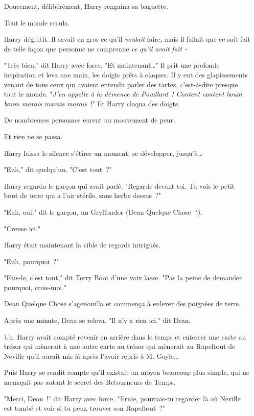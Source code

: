 Doucement, délibérément, Harry rengaina sa baguette.

Tout le monde recula.

Harry déglutit. Il savait en gros ce qu'il \emph{voulait} faire, mais il fallait que ce soit fait de telle façon que personne ne comprenne \emph{ce qu'il avait fait}~-

"Très bien," dit Harry avec force. "Et maintenant…" Il prit une profonde inspiration et leva une main, les doigts prêts à claquer. Il y eut des glapissements venant de tous ceux qui avaient entendu parler des tartes, c'est-à-dire presque tout le monde. "\emph{J'en appelle à la démence de Poudlard~! Content content boum boum marais marais marais}~!" Et Harry claqua des doigts.

De nombreuses personnes eurent un mouvement de peur.

Et rien ne se passa.

Harry laissa le silence s'étirer un moment, se développer, jusqu'à…

"Euh," dit quelqu'un. "C'est tout~?"

Harry regarda le garçon qui avait parlé. "Regarde devant toi. Tu vois le petit bout de terre qui a l'air stérile, sans herbe dessus~?"

"Euh, oui," dit le garçon, un Gryffondor (Dean Quelque Chose~?).

"Creuse ici."

Harry était maintenant la cible de regards intrigués.

"Euh, pourquoi~?"

"Fais-le, c'est tout," dit Terry Boot d'une voix lasse. "Pas la peine de demander pourquoi, crois-moi."

Dean Quelque Chose s'agenouilla et commença à enlever des poignées de terre.

Après une minute, Dean se releva. "Il n'y a rien ici," dit Dean.

Uh. Harry avait compté revenir en arrière dans le temps et enterrer une carte au trésor qui mènerait à une autre carte au trésor qui mènerait au Rapeltout de Neville qu'il aurait mis là après l'avoir repris à M. Goyle…

Puis Harry se rendit compte qu'il existait un moyen beaucoup plus simple, qui ne menaçait pas autant le secret des Retourneurs de Temps.

"Merci, Dean~!" dit Harry avec force. "Ernie, pourrais-tu regarder là où Neville est tombé et voir si tu peux trouver son Rapeltout~?"

